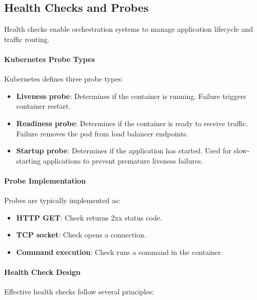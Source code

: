 \documentclass[a4paper,twoside]{sapthesis}
\begin{document}
\subsection{Health Checks and Probes}

Health checks enable orchestration systems to manage application lifecycle and traffic routing.

\paragraph{Kubernetes Probe Types}

Kubernetes defines three probe types:

\begin{itemize}
    \item \textbf{Liveness probe}: Determines if the container is running. Failure triggers container restart.
    
    \item \textbf{Readiness probe}: Determines if the container is ready to receive traffic. Failure removes the pod from load balancer endpoints.
    
    \item \textbf{Startup probe}: Determines if the application has started. Used for slow-starting applications to prevent premature liveness failures.
\end{itemize}

\paragraph{Probe Implementation}

Probes are typically implemented as:
\begin{itemize}
    \item \textbf{HTTP GET}: Check returns 2xx status code.
    \item \textbf{TCP socket}: Check opens a connection.
    \item \textbf{Command execution}: Check runs a command in the container.
\end{itemize}

\paragraph{Health Check Design}

Effective health checks follow several principles:
\end{document}

